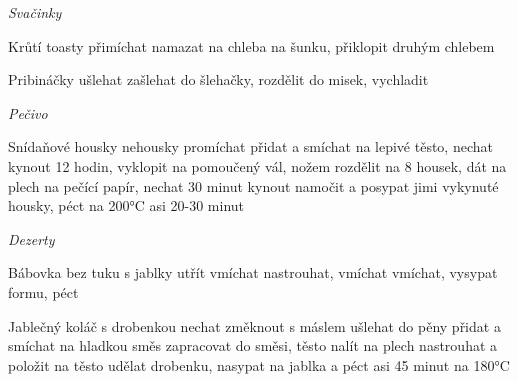 \documentclass[12pt,a4paper]{article}
\begin{document}
\vspace*{\fill}
\hfill {\Huge\it Svačinky}\hfill
\vspace*{\fill}
\newpage

\begin{recipe}{Krůtí toasty}
   přimíchat
   namazat
   na chleba
   na šunku, přiklopit druhým chlebem
\end{recipe}
\newpage

\begin{recipe}{Pribináčky}
   ušlehat
   zašlehat do šlehačky, rozdělit do misek, vychladit
\end{recipe}
\newpage

\vspace*{\fill}
\hfill {\Huge\it Pečivo}\hfill
\vspace*{\fill}
\newpage

\begin{recipe}{Snídaňové housky nehousky}
   promíchat
   přidat a smíchat na lepivé těsto, nechat kynout 12 hodin, vyklopit na pomoučený vál, nožem rozdělit na 8 housek, dát na plech na pečící papír, nechat 30 minut kynout
   namočit a posypat jimi vykynuté housky, péct na 200°C asi 20-30 minut
\end{recipe}
\newpage

\vspace*{\fill}
\hfill {\Huge\it Dezerty}\hfill
\vspace*{\fill}
\newpage

\begin{recipe}{Bábovka bez tuku s jablky}
   utřít
   vmíchat
   nastrouhat, vmíchat
   vmíchat, vysypat formu, péct
\end{recipe}
\newpage

\begin{recipe}{Jablečný koláč s drobenkou}
   nechat změknout
   s máslem ušlehat do pěny
   přidat a smíchat na hladkou směs
   zapracovat do směsi, těsto nalít na plech
   nastrouhat a položit na těsto
   udělat drobenku, nasypat na jablka a péct asi 45 minut na 180°C
\end{recipe}
\newpage
\end{document}
